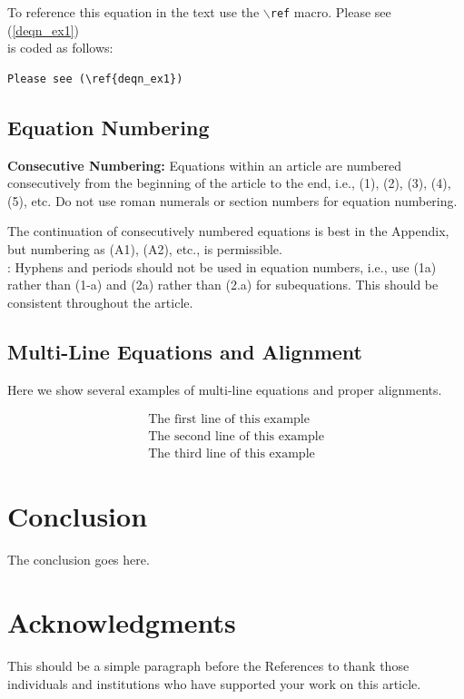 \documentclass[lettersize,journal]{IEEEtran}
\begin{document}
 To reference this equation in the text use the $\backslash${\tt{ref}} macro.
 Please see (\ref{deqn_ex1})\\
 \noindent is coded as follows:
 \begin{verbatim}
Please see (\ref{deqn_ex1})\end{verbatim}

 \subsection{Equation Numbering}
 {\bf{Consecutive Numbering:}} Equations within an article are numbered consecutively from the beginning of the
 article to the end, i.e., (1), (2), (3), (4), (5), etc. Do not use roman numerals or section numbers for equation numbering.

  The continuation of consecutively numbered equations is best in the Appendix, but numbering
 as (A1), (A2), etc., is permissible.\\

 : Hyphens and periods should not be used in equation numbers, i.e., use (1a) rather than
 (1-a) and (2a) rather than (2.a) for subequations. This should be consistent throughout the article.

 \subsection{Multi-Line Equations and Alignment}
 Here we show several examples of multi-line equations and proper alignments.

 \begin{multline}
  \text{The first line of this example}\\
  \text{The second line of this example}\\
  \text{The third line of this example}
 \end{multline}

 \section{Conclusion}
 The conclusion goes here.


 \section*{Acknowledgments}
 This should be a simple paragraph before the References to thank those individuals and institutions who have supported your work on this article.
\end{document}
